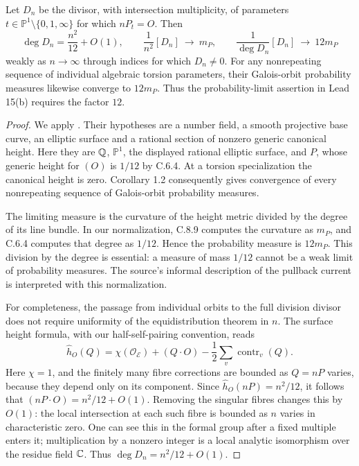 \begin{statement}
Let $D_n$ be the divisor, with intersection multiplicity, of
parameters $t\in\mathbb P^1\setminus\{0,1,\infty\}$ for which
$nP_t=O$. Then
\[
 \deg D_n=\frac{n^2}{12}+O(1),\qquad
 \frac1{n^2}[D_n]\ \longrightarrow\ m_P,\qquad
 \frac1{\deg D_n}[D_n]\ \longrightarrow\ 12m_P
\]
weakly as $n\to\infty$ through indices for which $D_n\ne0$.
For any nonrepeating sequence of individual algebraic torsion
parameters, their Galois-orbit probability measures likewise
converge to $12m_P$. Thus the probability-limit assertion
in Lead 15(b) requires the factor $12$.
\end{statement}
\begin{proof}
We apply \citet[Theorem 1.1 and Corollary 1.2]{demarco2017}.
Their hypotheses are a number field, a smooth projective
base curve, an elliptic surface and a rational section of
nonzero generic canonical height. Here they are $\mathbb Q$,
$\mathbb P^1$, the displayed rational elliptic surface,
and $P$, whose generic height for $(O)$ is $1/12$ by C.6.4.
At a torsion specialization the canonical height is zero.
Corollary 1.2 consequently gives convergence of every
nonrepeating sequence of Galois-orbit probability measures.

The limiting measure is the curvature of the height metric
divided by the degree of its line bundle. In our normalization,
C.8.9 computes the curvature as $m_P$, and C.6.4 computes
that degree as $1/12$. Hence the probability measure is
$12m_P$. This division by the degree is essential: a measure
of mass $1/12$ cannot be a weak limit of probability measures.
The source's informal description of the pullback current
is interpreted with this normalization.

For completeness, the passage from individual orbits to
the full division divisor does not require uniformity of
the equidistribution theorem in $n$. The surface height
formula, with our half-self-pairing convention, reads
\[
 \widehat h_O(Q)=\chi(\mathcal O_{\mathcal E})+(Q\cdot O)
                -\frac12\sum_v\operatorname{contr}_v(Q).
\]
Here $\chi=1$, and the finitely many fibre corrections are
bounded as $Q=nP$ varies, because they depend only on its
component. Since $\widehat h_O(nP)=n^2/12$, it follows
that $(nP\cdot O)=n^2/12+O(1)$. Removing the singular fibres
changes this by $O(1)$: the local intersection at each
such fibre is bounded as $n$ varies in characteristic zero.
One can see this in the formal group after a fixed
multiple enters it; multiplication by a nonzero integer
is a local analytic isomorphism over the residue field
$\mathbb C$. Thus $\deg D_n=n^2/12+O(1)$.


\end{proof}
